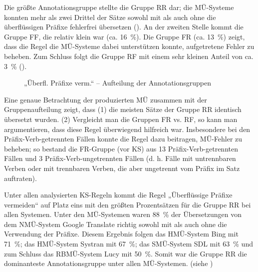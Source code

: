 Die größte Annotationsgruppe stellte die Gruppe RR dar; die MÜ-Systeme konnten mehr als zwei Drittel der Sätze sowohl mit als auch ohne die überflüssigen Präfixe fehlerfrei übersetzen (). An der zweiten Stelle kommt die Gruppe FF, die relativ klein war (ca. 16~\%). Die Gruppe FR (ca. 13~\%) zeigt, dass die Regel die MÜ-Systeme dabei unterstützen konnte, aufgetretene Fehler zu beheben. Zum Schluss folgt die Gruppe RF mit einem sehr kleinen Anteil von ca. 3~\% ().


\begin{figure}

\caption{\label{fig:05:114}„Überfl. Präfixe verm.“ -- Aufteilung der Annotationsgruppen   }
\end{figure}

Eine genaue Betrachtung der produzierten MÜ zusammen mit der Gruppenaufteilung zeigt, dass (1) die meisten Sätze der Gruppe RR identisch übersetzt wurden. (2) Vergleicht man die Gruppen FR vs. RF, so kann man argumentieren, dass diese Regel überwiegend hilfreich war. Insbesondere bei den Präfix-Verb-getrennten Fällen konnte die Regel dazu beitragen, MÜ-Fehler zu beheben; so bestand die FR-Gruppe (vor KS) aus 13 Präfix-Verb-getrennten Fällen und 3 Präfix-Verb-ungetrennten Fällen (d. h. Fälle mit untrennbaren Verben oder mit trennbaren Verben, die aber ungetrennt vom Präfix im Satz auftraten).


Unter allen analysierten KS-Regeln kommt die Regel „Überflüssige Präfixe vermeiden“ auf Platz eins mit den größten Prozentsätzen für die Gruppe RR bei allen Systemen. Unter den MÜ-Systemen waren 88~\% der Übersetzungen von dem NMÜ-System Google Translate richtig sowohl mit als auch ohne die Verwendung der Präfixe. Diesem Ergebnis folgen das HMÜ-System Bing mit 71~\%; das HMÜ-System Systran mit 67~\%; das SMÜ-System SDL mit 63~\% und zum Schluss das RBMÜ-System Lucy mit 50~\%. Somit war die Gruppe RR die dominanteste Annotationsgruppe unter allen MÜ-Systemen. (siehe )


